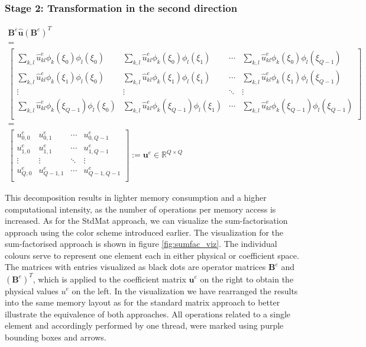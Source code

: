 \subsubsection*{Stage 2: Transformation in the second direction}
\begin{gather*}
\mathbf{B}^e \mathbf{\hat{u}} (\mathbf{B}^e)^T \\ 
               = \nonumber \\ 
\begin{bmatrix}
  \sum_{k,l} \hat{u}_{kl}^e\phi_k(\xi_0)\phi_l(\xi_0) & \sum_{k,l} \hat{u}_{kl}^e\phi_k(\xi_0)\phi_l(\xi_1) & \cdots & \sum_{k,l} \hat{u}_{kl}^e\phi_k(\xi_0)\phi_l(\xi_{Q-1}) \\
  \sum_{k,l} \hat{u}_{kl}^e\phi_k(\xi_1)\phi_l(\xi_0) & \sum_{k,l} \hat{u}_{kl}^e\phi_k(\xi_1)\phi_l(\xi_1) & \cdots & \sum_{k,l} \hat{u}_{kl}^e\phi_k(\xi_1)\phi_l(\xi_{Q-1}) \\
\vdots        & \vdots        & \ddots & \vdots        \\
\sum_{k,l} \hat{u}_{kl}^e\phi_k(\xi_{Q-1})\phi_l(\xi_0) & \sum_{k,l} \hat{u}_{kl}^e\phi_k(\xi_{Q-1})\phi_l(\xi_1) & \cdots & \sum_{k,l} \hat{u}_{kl}^e\phi_k(\xi_{Q-1})\phi_l(\xi_{Q-1}) \\
\end{bmatrix}  \nonumber \\ 
               = \nonumber \\
\begin{bmatrix}
  u^e_{0, 0} & u^e_{0, 1} & \cdots & u^e_{0, {Q-1}} \\
  u^e_{1, 0} & u^e_{1, 1} & \cdots & u^e_{1, {Q-1}} \\
\vdots        & \vdots        & \ddots & \vdots        \\
u^e_{Q, 0} & u^e_{{Q-1}, 1} & \cdots & u^e_{{Q-1}, {Q-1}} \\
\end{bmatrix} := \mathbf{u}^e \in \mathbb{R}^{Q \times Q}
\end{gather*}

This decomposition results in lighter memory consumption and a higher computational intensity, as the number of operations per memory access is increased.
As for the StdMat approach, we can visualize the sum-factorisation approach using the color scheme introduced earlier.
The visualization for the sum-factorised approach is shown in figure \ref{fig:sumfac_viz}.
The individual colours serve to represent one element each in either physical or coefficient space.
The matrices with entries visualized as black dots are operator matrices $\mathbf{B}^e$ and $(\mathbf{B}^e)^T$, which is applied to the coefficient matrix $\mathbf{u}^e$ on the right to obtain the physical values $u^e$ on the left.
In the visualization we have rearranged the results into the same memory layout as for the standard matrix approach to better illustrate the equivalence of both approaches.
All operations related to a single element and accordingly performed by one thread, were marked using purple bounding boxes and arrows.

